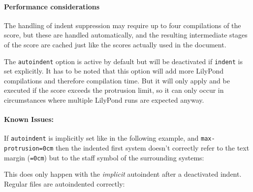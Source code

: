 \documentclass{scrartcl}
\begin{document}
\paragraph{Performance considerations}
The handling of indent suppression may require up to four compilations of the
score, but these are handled automatically, and the resulting intermediate
stages of the score are cached just like the scores actually used in the
document.

The \texttt{autoindent} option is active by default but will be deactivated if
\texttt{indent} is set explicitly. It has to be noted that this option will add
more LilyPond compilations and therefore compilation time. But it will only
apply and be executed if the score exceeds the protrusion limit, so it can only
occur in circumstances where multiple LilyPond runs are expected anyway.

\newpage
\paragraph{Known Issues:}
If \texttt{autoindent} is implicitly set like in the following example, and
\texttt{max-protrusion=0cm} then the indented first system doesn't correctly
refer to the text margin (\texttt{=0cm}) but to the staff symbol of the
surrounding systems:


This does only happen with the \emph{implicit} autoindent after a deactivated
indent. Regular files are autoindented correctly:

\end{document}
